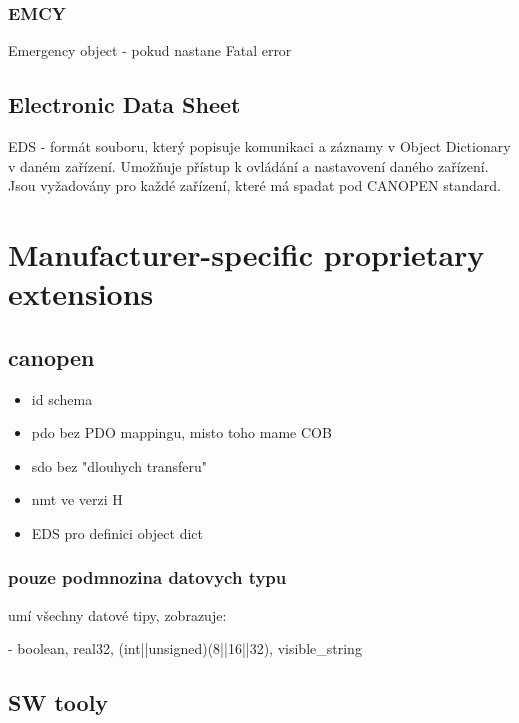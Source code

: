 \documentclass[
  field=ainfk,
  biblatex,
  glossaries,
  index
]{kidiplom}
\begin{document}
\subsubsection{EMCY}
Emergency object - pokud nastane Fatal error

\subsection{Electronic Data Sheet}
EDS - formát souboru, který popisuje komunikaci a záznamy v Object Dictionary v daném zařízení. Umožňuje přístup k ovládání a nastavovení daného zařízení. Jsou vyžadovány pro každé zařízení, které má spadat pod CANOPEN standard.

\section{Manufacturer-specific proprietary extensions}

\subsection{canopen}

\begin{itemize}
    \item id schema
    \item pdo bez PDO mappingu, misto toho mame COB
    \item sdo bez "dlouhych transferu"
    \item nmt ve verzi H
    \item EDS pro definici object dict
\end{itemize}

\subsubsection{pouze podmnozina datovych typu}

umí všechny datové tipy, zobrazuje:

 - boolean, real32, (int||unsigned)(8||16||32), visible_string 

\subsection{SW tooly}
\end{document}
